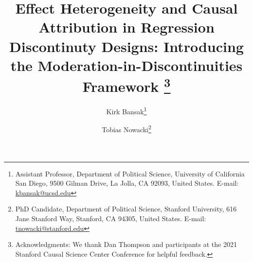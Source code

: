 \documentclass[12pt]{article}
\def\monthname{\ifcase\month\or
January\or February\or March\or April\or May\or June\or
July\or August\or September\or October\or November\or December\fi}
\begin{document}
\setcounter{page}{0}

\title{Effect Heterogeneity and Causal Attribution in Regression Discontinuty Designs: Introducing the Moderation-in-Discontinuities Framework \footnote{Acknowledgments: We thank Dan Thompson and participants at the 2021 Stanford Causal Science Center Conference for helpful feedback.}}

\author{
	Kirk Bansak\thanks{Assistant Professor, Department of Political Science, University of California San Diego, 9500 Gilman Drive, La Jolla, CA 92093, United States. E-mail: \href{mailto:kbansak@ucsd.edu}{kbansak@ucsd.edu}}
	\and
Tobias Nowacki\thanks{PhD Candidate, Department of Political Science, Stanford University, 616 Jane Stanford Way, Stanford, CA 94305, United States. E-mail: \href{mailto:tnowacki@stanford.edu}{tnowacki@stanford.edu}}
      \and 
    }

\maketitle
\thispagestyle{empty}


%
%
%
%
%

\vspace{0.25cm}
\end{document}
